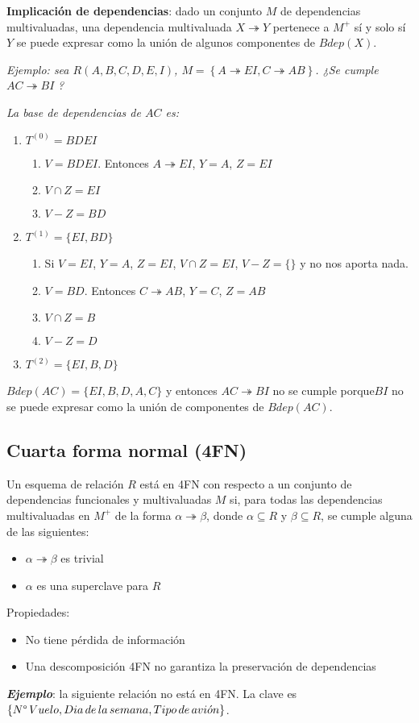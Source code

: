 \documentclass[a4paper, twoside]{article}
\begin{document}
\textbf{Implicación de dependencias}: dado un conjunto $M$ de dependencias
multivaluadas, una dependencia multivaluada $X\twoheadrightarrow Y$
pertenece a $M^{+}$ sí y solo sí $Y$ se puede expresar como la unión
de algunos componentes de $Bdep(X)$.

\emph{Ejemplo: sea $R(A,B,C,D,E,I)$, $M=\left\{ A\twoheadrightarrow EI,C\twoheadrightarrow AB\right\} $.
¿Se cumple }$AC\twoheadrightarrow BI$ \emph{?}

\emph{La base de dependencias de $AC$ es:}
\begin{enumerate}
\item $T^{(0)}=BDEI$

\begin{enumerate}
\item $V=BDEI$. Entonces $A\twoheadrightarrow EI$, $Y=A$, $Z=EI$
\item $V\cap Z=EI$
\item $V-Z=BD$
\end{enumerate}
\item $T^{(1)}=\{EI,BD\}$

\begin{enumerate}
\item Si $V=EI$, $Y=A$, $Z=EI$, $V\cap Z=EI$, $V-Z=\{\}$ y no nos aporta
nada.
\item $V=BD$. Entonces $C\twoheadrightarrow AB$, $Y=C$, $Z=AB$
\item $V\cap Z=B$
\item $V-Z=D$
\end{enumerate}
\item $T^{(2)}=\{EI,B,D\}$
\end{enumerate}
$Bdep(AC)=\{EI,B,D,A,C\}$ y entonces $AC\twoheadrightarrow BI$ no
se cumple porque$BI$ no se puede expresar como la unión de componentes
de $Bdep(AC)$.


\subsection{Cuarta forma normal (4FN)}

Un esquema de relación $R$ está en 4FN con respecto a un conjunto
de dependencias funcionales y multivaluadas $M$ si, para todas las
dependencias multivaluadas en $M^{+}$ de la forma $\alpha\twoheadrightarrow\beta$,
donde $\alpha\subseteq R$ y $\beta\subseteq R$, se cumple alguna
de las siguientes:
\begin{itemize}
\item $\alpha\twoheadrightarrow\beta$ es trivial
\item $\alpha$ es una superclave para $R$ 
\end{itemize}
Propiedades:
\begin{itemize}
\item No tiene pérdida de información
\item Una descomposición 4FN no garantiza la preservación de dependencias
\end{itemize}
\textbf{\emph{Ejemplo}}: la siguiente relación no está en 4FN. La
clave es $\left\{ N\text{\textdegree\,}Vuelo,Dia\, de\, la\, semana,Tipo\, de\, avi\acute{o}n\right\} $. 
\end{document}
